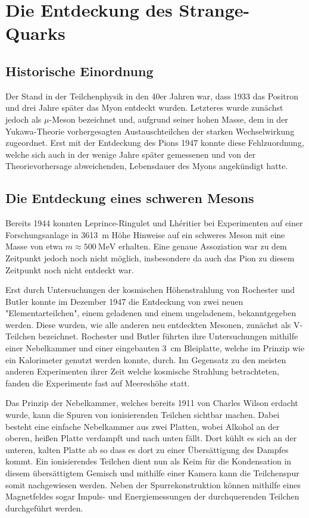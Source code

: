 
\section{Die Entdeckung des Strange-Quarks}
\label{sec:strange}

\subsection{Historische Einordnung}

Der Stand in der Teilchenphysik in den 40er Jahren war, dass 1933 das Positron und drei Jahre später das Myon entdeckt wurden.
Letzteres wurde zunächst jedoch als $\mu$-Meson bezeichnet und, aufgrund seiner hohen Masse, dem in der Yukawa-Theorie vorhergesagten Austauschteilchen der starken Wechselwirkung zugeordnet.
Erst mit der Entdeckung des Pions 1947 konnte diese Fehlzuordnung, welche sich auch in der wenige Jahre später gemessenen und von der Theorievorhersage abweichenden, Lebensdauer des Myons angekündigt hatte.

\subsection{Die Entdeckung eines schweren Mesons}

Bereits 1944 konnten Leprince-Ringulet und Lhéritier bei Experimenten auf einer Forschungsanlage in \SI{3613}{\metre} Höhe Hinweise auf ein schweres Meson mit eine Masse von etwa $m \approx \SI{500}{\mega\electronvolt}$ erhalten.
Eine genaue Assoziation war zu dem Zeitpunkt jedoch noch nicht möglich, insbesondere da auch das Pion zu diesem Zeitpunkt noch nicht entdeckt war.

Erst durch Untersuchungen der kosmischen Höhenstrahlung von Rochester und Butler konnte im Dezember 1947 die Entdeckung von zwei neuen "Elementarteilchen", einem geladenen und einem ungeladenem, bekanntgegeben werden.
Diese wurden, wie alle anderen neu entdeckten Mesonen, zunächst als V-Teilchen bezeichnet.
Rochester und Butler führten ihre Untersuchungen mithilfe einer Nebelkammer und einer eingebauten \SI{3}{\centi\metre} Bleiplatte, welche im Prinzip wie ein Kalorimeter genutzt werden konnte, durch. 
Im Gegensatz zu den meisten anderen Experimenten ihrer Zeit welche kosmische Strahlung betrachteten, fanden die Experimente fast auf Meereshöhe statt.

Das Prinzip der Nebelkammer, welches bereits 1911 von Charles Wilson erdacht wurde, kann die Spuren von ionisierenden Teilchen sichtbar machen.
Dabei besteht eine einfache Nebelkammer aus zwei Platten, wobei Alkohol an der oberen, heißen Platte verdampft und nach unten fällt.
Dort kühlt es sich an der unteren, kalten Platte ab so dass es dort zu einer Übersättigung des Dampfes kommt.
Ein ionisierendes Teilchen dient nun als Keim für die Kondensation in diesem übersättigtem Gemisch und mithilfe einer Kamera kann die Teilchenspur somit nachgewiesen werden.
Neben der Spurrekonstruktion können mithilfe eines Magnetfeldes sogar Impuls- und Energiemessungen der durchquerenden Teilchen durchgeführt werden.

